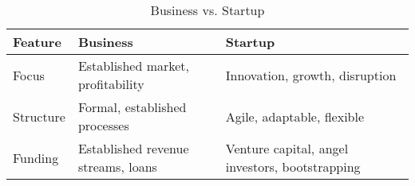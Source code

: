 

\begin{table}[h]
\centering
\begin{tabular}{|l|l|l|}
\hline
Feature & Business & Startup \\ \hline
Focus & Established market, profitability & Innovation, growth, disruption \\ \hline
Structure & Formal, established processes & Agile, adaptable, flexible \\ \hline
Funding & Established revenue streams, loans & Venture capital, angel investors, bootstrapping \\ \hline
\end{tabular}
\caption{Business vs. Startup}
\label{tab:business_vs_startup}
\end{table}
